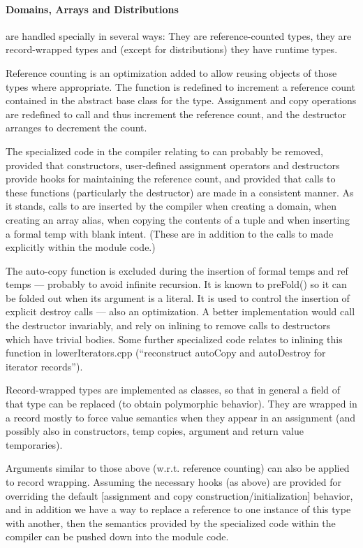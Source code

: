 \paragraph{Domains, Arrays and Distributions}
are handled specially in several ways: They
are reference-counted types, they are record-wrapped types and (except for
distributions) they have runtime types.

Reference counting is an optimization added to allow reusing objects of those
types where appropriate.  The function  is redefined to
increment a reference count contained in the abstract base class for the type.
Assignment and copy operations are redefined to call  and
thus increment the reference count, and the destructor arranges to decrement the
count.

The specialized code in the compiler relating to  can probably be
removed, provided that constructors, user-defined assignment operators and destructors
provide hooks for maintaining the reference count, and provided that calls to
these functions (particularly the destructor) are made in a consistent manner.
As it stands, calls to  are inserted by the compiler when
creating a domain, when creating an array alias, when copying the contents of a
tuple and when inserting a formal temp with blank intent.  (These are in
addition to the calls to  made explicitly within the module
code.)

The auto-copy function is excluded during the insertion of formal temps and ref
temps --- probably to avoid infinite recursion.  It is known to preFold() so it
can be folded out when its argument is a literal.  It is
used to control the insertion of explicit destroy calls --- also an
optimization.  A better implementation would call the destructor invariably,
and rely on inlining to remove calls to destructors which have trivial bodies.
Some further specialized code relates to inlining this function in lowerIterators.cpp
(``reconstruct autoCopy and autoDestroy for iterator records'').

Record-wrapped types are implemented as classes, so that in general a field of
that type can be replaced (to obtain polymorphic behavior).  They are wrapped in
a record mostly to force value semantics when they appear in an assignment (and
possibly also in constructors, temp copies, argument and return value
temporaries).  

Arguments similar to those above (w.r.t. reference counting) can also be applied
to record wrapping.  Assuming the necessary hooks (as above) are provided for
overriding the default [assignment and copy construction/initialization]
behavior, and in addition we have a way to replace a reference to one instance
of this type with another, then the semantics provided by the specialized code
within the compiler can be pushed down into the module code.

